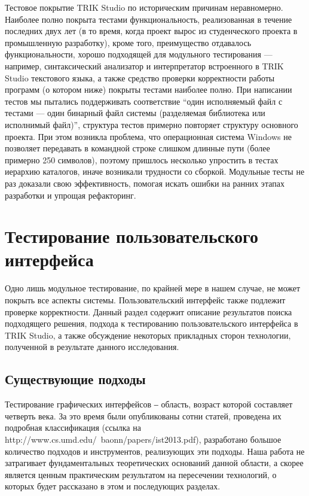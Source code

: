 ﻿\documentclass[conference]{IEEEtran}
\begin{document}
Тестовое покрытие TRIK Studio по историческим причинам неравномерно. Наиболее полно 
покрыта тестами функциональность, реализованная в течение последних двух лет (в то время, 
когда проект вырос из студенческого проекта в промышленную разработку), кроме того, 
преимущество отдавалось функциональности, хорошо подходящей для модульного тестирования 
--- например, синтаксический анализатор и интерпретатор встроенного в TRIK Studio 
текстового языка, а также средство проверки корректности работы программ (о котором ниже) 
покрыты тестами наиболее полно. При написании тестов мы пытались поддерживать соответствие 
"`один исполняемый файл с тестами --- один бинарный файл системы (разделяемая библиотека 
или исполнимый файл)"', структура тестов примерно повторяет структуру основного проекта. 
При этом возникла проблема, что операционная система Windows не позволяет передавать 
в командной строке слишком длинные пути (более примерно 250 символов), поэтому пришлось 
несколько упростить в тестах иерархию каталогов, иначе возникали трудности со сборкой. 
Модульные тесты не раз доказали свою эффективность, помогая искать ошибки на ранних этапах 
разработки и упрощая рефакторинг.

\section{Тестирование пользовательского интерфейса}
Одно лишь модульное тестирование, по крайней мере в нашем случае, не может покрыть 
все аспекты системы. Пользовательский интерфейс также подлежит проверке корректности. 
Данный раздел содержит описание результатов поиска подходящего решения, подхода к 
тестированию пользовательского интерфейса в TRIK Studio, а также обсуждение некоторых 
прикладных сторон технологии, полученной в результате данного исследования.

\subsection{Существующие подходы}
Тестирование графических интерфейсов ‒ область, возраст которой составляет четверть 
века. За это время были опубликованы сотни статей, проведена их подробная классификация 
(ссылка на http://www.cs.umd.edu/~baonn/papers/ist2013.pdf), разработано большое количество 
подходов и инструментов, реализующих эти подходы. Наша работа не затрагивает фундаментальных 
теоретических оснований данной области, а скорее является ценным практическим результатом 
на пересечении технологий, о которых будет рассказано в этом и последующих разделах.
\end{document}
